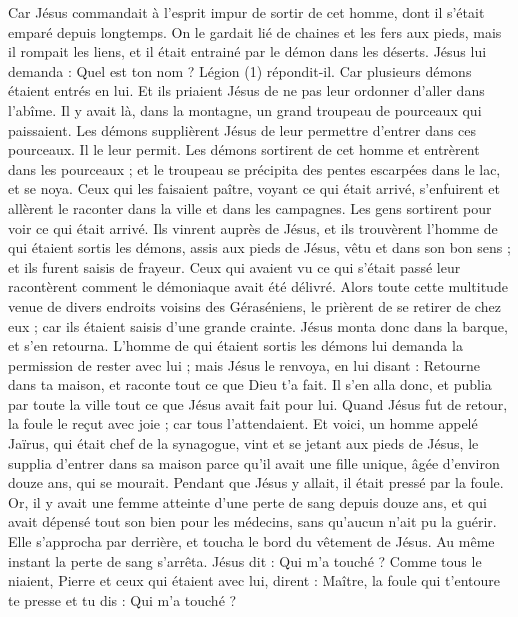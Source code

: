 \begin{multicols}{2}
Car Jésus commandait à l'esprit impur de sortir de cet homme, dont il s’était emparé depuis longtemps. On le gardait lié de chaines et les fers aux pieds, mais il rompait les liens, et il était entrainé par le démon dans les déserts.
Jésus lui demanda : Quel est ton nom ? Légion (1) répondit-il. Car plusieurs démons étaient entrés en lui.
Et ils priaient Jésus de ne pas leur ordonner d’aller dans l'abîme.
Il y avait là, dans la montagne, un grand troupeau de pourceaux qui paissaient. Les démons supplièrent Jésus de leur permettre d'entrer dans ces pourceaux. Il le leur permit.
Les démons sortirent de cet homme et entrèrent dans les pourceaux ; et le troupeau se précipita des pentes escarpées dans le lac, et se noya.
Ceux qui les faisaient paître, voyant ce qui était arrivé, s'enfuirent et allèrent le raconter dans la ville et dans les campagnes.
Les gens sortirent pour voir ce qui était arrivé. Ils vinrent auprès de Jésus, et ils trouvèrent l'homme de qui étaient sortis les démons, assis aux pieds de Jésus, vêtu et dans son bon sens ; et ils furent saisis de frayeur.
Ceux qui avaient vu ce qui s’était passé leur racontèrent comment le démoniaque avait été délivré.
Alors toute cette multitude venue de divers endroits voisins des Géraséniens, le prièrent de se retirer de chez eux ; car ils étaient saisis d'une grande crainte. Jésus monta donc dans la barque, et s'en retourna.
L'homme de qui étaient sortis les démons lui demanda la permission de rester avec lui ; mais Jésus le renvoya, en lui disant :
Retourne dans ta maison, et raconte tout ce que Dieu t’a fait. Il s'en alla donc, et publia par toute la ville tout ce que Jésus avait fait pour lui.
Quand Jésus fut de retour, la foule le reçut avec joie ; car tous l'attendaient.
Et voici, un homme appelé Jaïrus, qui était chef de la synagogue, vint et se jetant aux pieds de Jésus, le supplia d’entrer dans sa maison
parce qu’il avait une fille unique, âgée d'environ douze ans, qui se mourait. Pendant que Jésus y allait, il était pressé par la foule.
Or, il y avait une femme atteinte d’une perte de sang depuis douze ans, et qui avait dépensé tout son bien pour les médecins, sans qu’aucun n’ait pu la guérir.
Elle s’approcha par derrière, et toucha le bord du vêtement de Jésus. Au même instant la perte de sang s'arrêta.
Jésus dit : Qui m'a touché ? Comme tous le niaient, Pierre et ceux qui étaient avec lui, dirent : Maître, la foule qui t’entoure te presse et tu dis : Qui m'a touché ?

\end{multicols}
